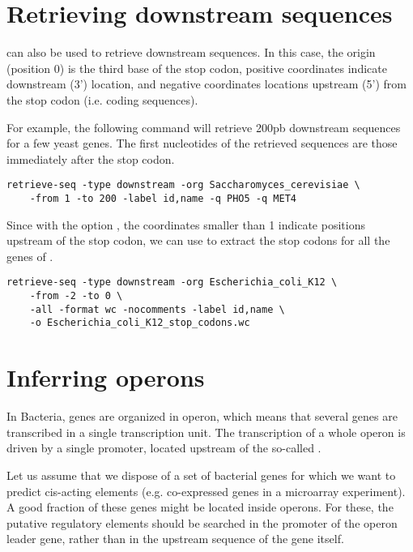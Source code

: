 \section{Retrieving downstream sequences}

 can also be used to retrieve downstream
sequences. In this case, the origin (position 0) is the third base of
the stop codon, positive coordinates indicate downstream (3')
location, and negative coordinates locations upstream (5') from the
stop codon (i.e. coding sequences). 

For example, the following command will retrieve 200pb downstream
sequences for a few yeast genes. The first nucleotides of the
retrieved sequences are those immediately after the stop codon.

{\color{Blue} \begin{footnotesize}
\begin{verbatim}
retrieve-seq -type downstream -org Saccharomyces_cerevisiae \
    -from 1 -to 200 -label id,name -q PHO5 -q MET4
\end{verbatim} \end{footnotesize}
}

Since with the option , the coordinates
smaller than 1 indicate positions upstream of the stop codon, we can
use \program{retrieve-seq} to extract the stop codons for all the
genes of \org{Escherichia coli}.

{\color{Blue} \begin{footnotesize}
\begin{verbatim}
retrieve-seq -type downstream -org Escherichia_coli_K12 \
    -from -2 -to 0 \
    -all -format wc -nocomments -label id,name \
    -o Escherichia_coli_K12_stop_codons.wc
\end{verbatim} \end{footnotesize}
}

\section{Inferring operons}

In Bacteria, genes are organized in operon, which means that several
genes are transcribed in a single transcription unit. The
transcription of a whole operon is driven by a single promoter,
located upstream of the so-called .

Let us assume that we dispose of a set of bacterial genes for which we
want to predict cis-acting elements (e.g. co-expressed genes in a
microarray experiment). A good fraction of these genes might be
located inside operons. For these, the putative regulatory elements
should be searched in the promoter of the operon leader gene, rather
than in the upstream sequence of the gene itself.

